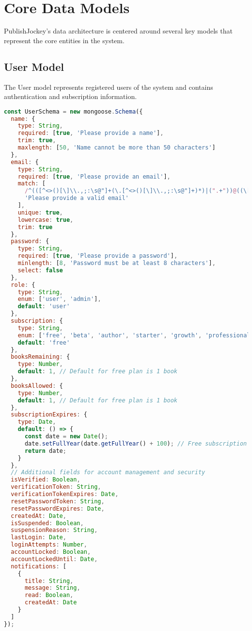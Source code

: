 \documentclass[12pt,a4paper]{book}
\begin{document}
\section{Core Data Models}

PublishJockey's data architecture is centered around several key models that represent the core entities in the system.

\subsection{User Model}

The User model represents registered users of the system and contains authentication and subscription information.

\begin{lstlisting}[language=JavaScript, caption=User Schema]
const UserSchema = new mongoose.Schema({
  name: {
    type: String,
    required: [true, 'Please provide a name'],
    trim: true,
    maxlength: [50, 'Name cannot be more than 50 characters']
  },
  email: {
    type: String,
    required: [true, 'Please provide an email'],
    match: [
      /^(([^<>()[\]\\.,;:\s@"]+(\.[^<>()[\]\\.,;:\s@"]+)*)|(".+"))@((\[[0-9]{1,3}\.[0-9]{1,3}\.[0-9]{1,3}\.[0-9]{1,3}\])|(([a-zA-Z\-0-9]+\.)+[a-zA-Z]{2,}))$/,
      'Please provide a valid email'
    ],
    unique: true,
    lowercase: true,
    trim: true
  },
  password: {
    type: String,
    required: [true, 'Please provide a password'],
    minlength: [8, 'Password must be at least 8 characters'],
    select: false
  },
  role: {
    type: String,
    enum: ['user', 'admin'],
    default: 'user'
  },
  subscription: {
    type: String,
    enum: ['free', 'beta', 'author', 'starter', 'growth', 'professional', 'power', 'custom'],
    default: 'free'
  },
  booksRemaining: {
    type: Number,
    default: 1, // Default for free plan is 1 book
  },
  booksAllowed: {
    type: Number,
    default: 1, // Default for free plan is 1 book
  },
  subscriptionExpires: {
    type: Date,
    default: () => {
      const date = new Date();
      date.setFullYear(date.getFullYear() + 100); // Free subscription "expires" in 100 years
      return date;
    }
  },
  // Additional fields for account management and security
  isVerified: Boolean,
  verificationToken: String,
  verificationTokenExpires: Date,
  resetPasswordToken: String,
  resetPasswordExpires: Date,
  createdAt: Date,
  isSuspended: Boolean,
  suspensionReason: String,
  lastLogin: Date,
  loginAttempts: Number,
  accountLocked: Boolean,
  accountLockedUntil: Date,
  notifications: [
    {
      title: String,
      message: String,
      read: Boolean,
      createdAt: Date
    }
  ]
});
\end{lstlisting}
\end{document}
